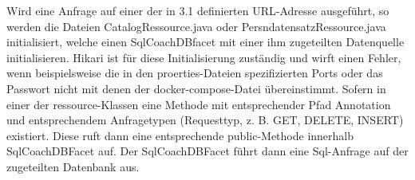 \documentclass[fleqn,10pt,ngerman]{SelfArx}
\begin{document}
		Wird eine Anfrage auf einer der in 3.1 definierten URL-Adresse ausgeführt, so werden die Dateien CatalogRessource.java oder PersndatensatzRessource.java initialisiert, welche einen SqlCoachDBfacet mit einer ihm zugeteilten Datenquelle initialisieren. Hikari ist für diese Initialisierung zuständig und wirft einen Fehler, wenn beispielsweise die in den proerties-Dateien spezifizierten Ports oder das Passwort nicht mit denen der docker-compose-Datei übereinstimmt. Sofern in einer der ressource-Klassen eine Methode mit entsprechender Pfad Annotation und entsprechendem Anfragetypen (Requesttyp, z. B. GET, DELETE, INSERT) existiert.
		Diese ruft dann eine entsprechende public-Methode innerhalb SqlCoachDBFacet auf. Der SqlCoachDBFacet führt dann eine Sql-Anfrage auf der zugeteilten Datenbank aus. 
		
		
		
		
		
	
\end{document}
